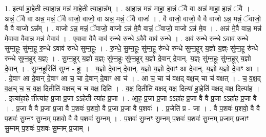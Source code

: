 \documentclass[17pt]{extarticle}
\begin{document}
1. इत्या॑ हा॒हेती त्या॒हान्न॒ मन्न॑ मा॒हेती त्या॒हान्न᳚म् । . आ॒हान्न॒ मन्न॑ माहा॒ हान्नं॒ ॅवै वा अन्न॑ माहा॒ हान्नं॒ ॅवै । . अन्नं॒ ॅवै वा अन्न॒ मन्नं॒ ॅवै वाजो॒ वाजो॒ वा अन्न॒ मन्नं॒ ॅवै वाजः॑ । . वै वाजो॒ वाजो॒ वै वै वाजो ऽन्न॒ मन्नं॒ ॅवाजो॒ वै वै वाजो ऽन्न᳚म् । . वाजो ऽन्न॒ मन्नं॒ ॅवाजो॒ वाजो ऽन्न॑ मे॒वै वान्नं॒ ॅवाजो॒ वाजो ऽन्न॑ मे॒व । . अन्न॑ मे॒वै वान्न॒ मन्न॑ मे॒वावा वै॒वान्न॒ मन्न॑ मे॒वाव॑ । . ए॒वावा वै॒वै वाव॑ रुन्धे रु॒न्धे ऽवै॒वै वाव॑ रुन्धे । . अव॑ रुन्धे रु॒न्धे ऽवाव॑ रुन्धे सुम्न॒हूः सु॑म्न॒हू रु॒न्धे ऽवाव॑ रुन्धे सुम्न॒हूः । . रु॒न्धे॒ सु॒म्न॒हूः सु॑म्न॒हू रु॑न्धे रुन्धे सुम्न॒हूर् य॒ज्ञो य॒ज्ञ्ः सु॑म्न॒हू रु॑न्धे रुन्धे सुम्न॒हूर् य॒ज्ञ्ः । . सु॒म्न॒हूर् य॒ज्ञो य॒ज्ञ्ः सु॑म्न॒हूः सु॑म्न॒हूर् य॒ज्ञो दे॒वान् दे॒वान्. य॒ज्ञ्ः सु॑म्न॒हूः सु॑म्न॒हूर् य॒ज्ञो दे॒वान् । . सु॒म्न॒हूरिति॑ सुम्न - हूः । . य॒ज्ञो दे॒वान् दे॒वान्. य॒ज्ञो य॒ज्ञो दे॒वाꣳ आ दे॒वान्. य॒ज्ञो य॒ज्ञो दे॒वाꣳ आ । . दे॒वाꣳ आ दे॒वान् दे॒वाꣳ आ च॒ चा दे॒वान् दे॒वाꣳ आ च॑ । . आ च॒ चा च॑ वक्षद् वक्ष॒च् चा च॑ वक्षत् । . च॒ व॒क्ष॒द् व॒क्ष॒च् च॒ च॒ व॒क्ष॒ दितीति॑ वक्षच् च च वक्ष॒ दिति॑ । . व॒क्ष॒ दितीति॑ वक्षद् वक्ष॒ दित्या॑ हा॒हेति॑ वक्षद् वक्ष॒ दित्या॑ह । . इत्या॑हा॒हे तीत्या॑ह प्र॒जा प्र॒जा ऽऽहेती त्या॑ह प्र॒जा । . आ॒ह॒ प्र॒जा प्र॒जा ऽऽहा॑ह प्र॒जा वै वै प्र॒जा ऽऽहा॑ह प्र॒जा वै । . प्र॒जा वै वै प्र॒जा प्र॒जा वै प॒शवः॑ प॒शवो॒ वै प्र॒जा प्र॒जा वै प॒शवः॑ । . प्र॒जेति॑ प्र - जा । . वै प॒शवः॑ प॒शवो॒ वै वै प॒शवः॑ सु॒म्नꣳ सु॒म्नम् प॒शवो॒ वै वै प॒शवः॑ सु॒म्नम् । . प॒शवः॑ सु॒म्नꣳ सु॒म्नम् प॒शवः॑ प॒शवः॑ सु॒म्नम् प्र॒जाम् प्र॒जाꣳ सु॒म्नम् प॒शवः॑ प॒शवः॑ सु॒म्नम् प्र॒जाम् । \newline
\end{document}
